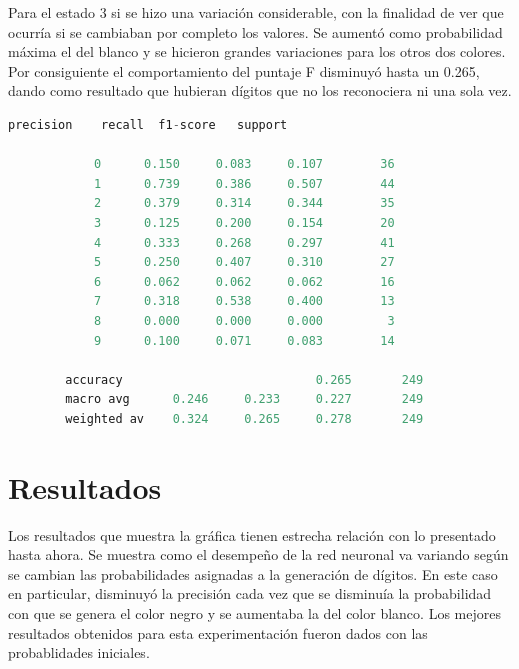\documentclass{article}
\begin{document}
Para el estado 3 si se hizo una variación considerable, con la finalidad de ver que ocurría si se cambiaban por completo los valores. Se aumentó como probabilidad máxima el del blanco y se hicieron grandes variaciones para los otros dos colores. Por consiguiente el comportamiento del puntaje F disminuyó hasta un 0.265, dando como resultado que hubieran dígitos que no los reconociera ni una sola vez.

\begin{lstlisting}[language=Python]
			precision    recall  f1-score   support
	
			0      0.150     0.083     0.107        36
			1      0.739     0.386     0.507        44
			2      0.379     0.314     0.344        35
			3      0.125     0.200     0.154        20
			4      0.333     0.268     0.297        41
			5      0.250     0.407     0.310        27
			6      0.062     0.062     0.062        16
			7      0.318     0.538     0.400        13
			8      0.000     0.000     0.000         3
			9      0.100     0.071     0.083        14
	
		accuracy                       	   0.265       249
		macro avg      0.246     0.233     0.227       249
		weighted av    0.324     0.265     0.278       249
\end{lstlisting}


\section{Resultados}

Los resultados que muestra la gráfica tienen estrecha relación con lo presentado hasta ahora. Se muestra como el desempeño de la red neuronal va variando según se cambian las probabilidades asignadas a la generación de dígitos. En este caso en particular, disminuyó la precisión cada vez que se disminuía la probabilidad con que se genera el color negro y se aumentaba la del color blanco. Los mejores resultados obtenidos para esta experimentación fueron dados con las probablidades iniciales.  
\end{document}
